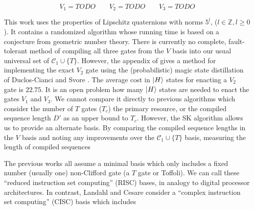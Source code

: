 \begin{equation}
V_1 = TODO \qquad V_2 = TODO \qquad V_3 = TODO
\end{equation}

This work uses the properties of Lipschitz quaternions with norms $5^l$, ($l \in \mathbb{Z}, l \ge 0$). It
contains a randomized algorithm whose running time is based on a conjecture from geometric number theory.
There is currently no complete, fault-tolerant method of compiling all three gates from the $V$ basis into
our usual universal set of $\mathcal{C}_1 \cup \{T\}$. However, the appendix of \cite{Bocharov2013}
gives a method for implementing the exact $V_2$ gate using the (probabilistic) magic state distillation of
Duclos-Cianci and Svore \cite{DuclosCianci2012}. The average cost in $\left\vert{H}\right\rangle$
states for enacting a $V_2$ gate is $22.75$. It is an open problem how many
$\left\vert{H}\right\rangle$ states are needed to enact the gates $V_1$ and $V_3$.
We cannot compare it directly to previous algorithms which consider the number of $T$ gates ($T_c$)
the primary resource, or the compiled sequence length $D'$ as an upper bound to $T_c$.
However, the SK algorithm allows us to provide an alternate basis. By
comparing the compiled sequence lengths in the $V$ basis and noting any
improvements over the $\mathcal{C}_1 \cup \{T\}$ basis, 
measuring the length of compiled sequences 

The previous works all assume a minimal basis which only includes a fixed
number (usually one) non-Clifford gate (a $T$ gate or Toffoli). We can
call these ``reduced instruction set computing'' (RISC) bases, in analogy to
digital processor architectures.
In contrast, Landahl and
Cesare consider a ``complex instruction set computing'' (CISC) basis which
includes 